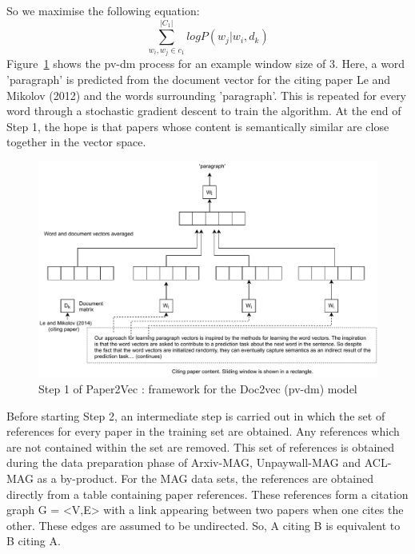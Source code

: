 So we maximise the following equation: 
\begin{equation}
    \sum\limits_{w_i, w_j \in c_1}^{|C_1|} log P(w_j|{w_i, d_k})
\end{equation}
Figure~\ref{fig:pvdm} shows the pv-dm process for an example window size of 3. Here, a word 'paragraph' is predicted from the document vector for the citing paper Le and Mikolov (2012) and the words surrounding 'paragraph'. This is repeated for every word through a stochastic gradient descent to train the algorithm.
At the end of Step 1, the hope is that papers whose content is semantically similar are close together in the vector space. 
\begin{figure}
\centering
 \includegraphics[keepaspectratio, width=13cm]{figures/Approach/pvdm.pdf}
  \caption{Step 1 of Paper2Vec \cite{GangulyP17}: framework for the Doc2vec (pv-dm) model}
  \label{fig:pvdm}
\end{figure}
Before starting Step 2, an intermediate step is carried out in which the set of references for every paper in the training set are obtained. Any references which are not contained within the set are removed. This set of references is obtained during the data preparation phase of Arxiv-MAG, Unpaywall-MAG and ACL-MAG as a by-product. For the MAG data sets, the references are obtained directly from a table containing paper references. These references form a citation graph G = <V,E> with a link appearing between two papers when one cites the other. These edges are assumed to be undirected. So, A citing B is equivalent to B citing A.


